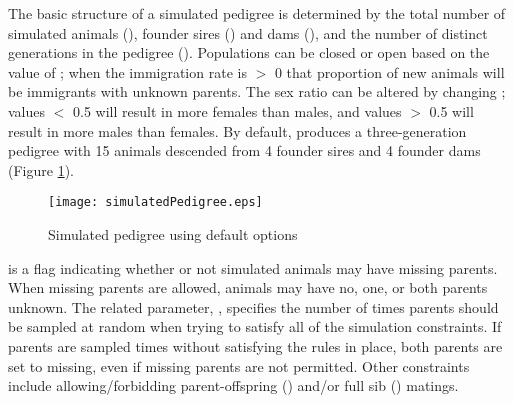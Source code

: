The basic structure of a simulated pedigree is determined by the total number of simulated animals (), founder sires () and dams (), and the number of distinct generations in the pedigree (). Populations can be closed or open based on the value of ; when the immigration rate is $>$ 0 that proportion of new animals will be immigrants with unknown parents. The sex ratio can be altered by changing ; values $<$ 0.5 will result in more females than males, and values $>$ 0.5 will result in more males than females. By default,  produces a three-generation pedigree with 15 animals descended from 4 founder sires and 4 founder dams (Figure \ref{fig:example-simulated-pedigree}).
\begin{figure}
  \begin{center}
    \texttt{[image: simulatedPedigree.eps]}
    \caption{Simulated pedigree using default options}
    \label{fig:example-simulated-pedigree}
  \end{center}
\end{figure}
 is a flag indicating whether or not simulated animals may have missing parents. When missing parents are allowed, animals may have no, one, or both parents unknown. The related parameter, , specifies the number of times parents should be sampled at random when trying to satisfy all of the simulation constraints. If parents are sampled  times without satisfying the rules in place, both parents are set to missing, even if missing parents are not permitted. Other constraints include allowing/forbidding parent-offspring () and/or full sib () matings.
